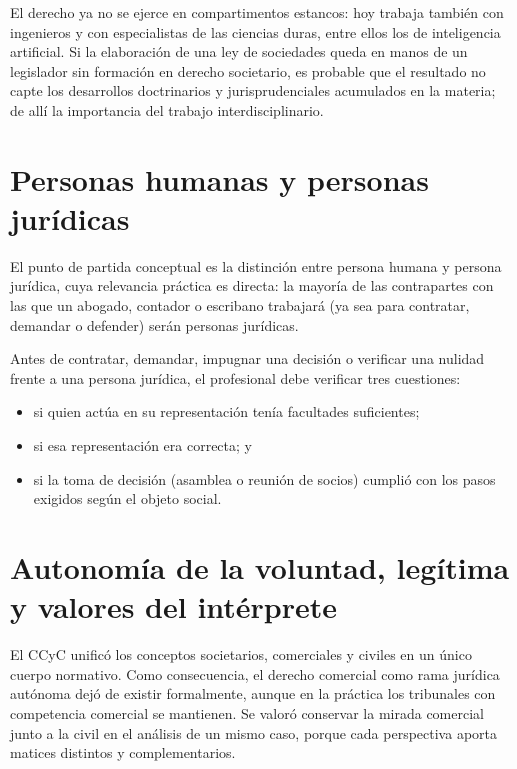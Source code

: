 \documentclass[12pt,oneside]{book}
\begin{document}
\begin{important}
El derecho ya no se ejerce en compartimentos estancos: hoy trabaja también con ingenieros y con especialistas de las ciencias duras, entre ellos los de inteligencia artificial. Si la elaboración de una ley de sociedades queda en manos de un legislador sin formación en derecho societario, es probable que el resultado no capte los desarrollos doctrinarios y jurisprudenciales acumulados en la materia; de allí la importancia del trabajo interdisciplinario.
\end{important}

\section{Personas humanas y personas jurídicas}

El punto de partida conceptual es la distinción entre persona humana y persona jurídica, cuya relevancia práctica es directa: la mayoría de las contrapartes con las que un abogado, contador o escribano trabajará (ya sea para contratar, demandar o defender) serán personas jurídicas.

\begin{important}
Antes de contratar, demandar, impugnar una decisión o verificar una nulidad frente a una persona jurídica, el profesional debe verificar tres cuestiones:
\begin{itemize}
    \item si quien actúa en su representación tenía facultades suficientes;
    \item si esa representación era correcta; y
    \item si la toma de decisión (asamblea o reunión de socios) cumplió con los pasos exigidos según el objeto social.
\end{itemize}
\end{important}

\section{Autonomía de la voluntad, legítima y valores del intérprete}
\label{sec:autonomia}

El CCyC unificó los conceptos societarios, comerciales y civiles en un único cuerpo normativo. Como consecuencia, el derecho comercial como rama jurídica autónoma dejó de existir formalmente, aunque en la práctica los tribunales con competencia comercial se mantienen. Se valoró conservar la mirada comercial junto a la civil en el análisis de un mismo caso, porque cada perspectiva aporta matices distintos y complementarios.
\end{document}
